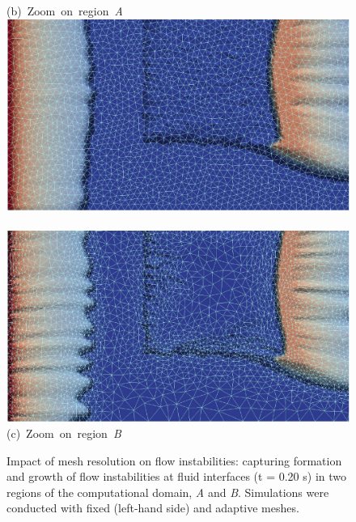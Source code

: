 \begin{figure}[ht]
{      \vspace{-0.cm}\hbox{\hspace{4.5cm}(b) Zoom on region {\it A}  }\vspace{-0.cm}
      \hbox{ \includegraphics[width=.5\textwidth, height=0.3\textwidth,clip]{./Pics1/Section4_4/5r_po_left_inlet_D251_Zoom2b.pdf}
             \includegraphics[width=.5\textwidth, height=0.3\textwidth,clip]{./Pics1/Section4_4/5r_po_left_inlet_adapt_D251_Zoom2b.pdf}}
      \vspace{-0.cm}\hbox{\hspace{4.5cm}(c) Zoom on region {\it B}  }\vspace{-0.cm}}
\caption{Impact of mesh resolution on flow instabilities: capturing formation and growth of flow instabilities at fluid interfaces (t = 0.20 s) in two regions of the computational domain, {\it A} and {\it B}. Simulations were conducted with fixed (left-hand side) and adaptive meshes. }
\label{fig:5regions_AdaptZoom}
\end{figure}
\clearpage



